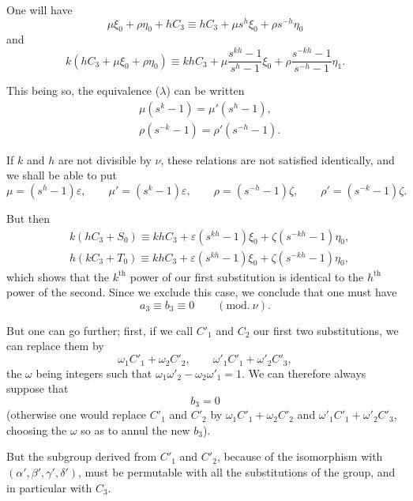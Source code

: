 \documentclass{article}
\begin{document}
One will have
\[ \mu\xi_{0} + \rho\eta_{0} + hC_{3} \equiv hC_{3} + \mu s^{h}\xi_{0} + \rho s^{-h}\eta_{0} \]
and
\[ k(hC_{3} + \mu\xi_{0} + \rho\eta_{0}) \equiv khC_{3} + \mu\frac{s^{kh} - 1}{s^{h} - 1}\xi_{0} + \rho\frac{s^{-kh} - 1}{s^{-h} - 1}\eta_{1}. \]

This being so, the equivalence ($\lambda$) can be written
\[ \begin{aligned} &\mu(s^{k} - 1) = \mu'(s^{h} - 1),\\ &\rho(s^{-k} - 1) = \rho'(s^{-h} - 1). \end{aligned} \]

If $k$ and $h$ are not divisible by $\nu$, these relations are not satisfied
identically, and we shall be able to put
\[ \mu = (s^{h} - 1)\varepsilon, \qquad \mu' = (s^{k} - 1)\varepsilon, \qquad \rho = (s^{-h} - 1)\zeta, \qquad \rho' = (s^{-k} - 1)\zeta. \]

But then
\[ \begin{aligned} &k(hC_{3} + S_{0}) \equiv khC_{3} + \varepsilon(s^{kh} - 1)\xi_{0} + \zeta(s^{-kh} - 1)\eta_{0},\\ &h(kC_{3} + T_{0}) \equiv khC_{3} + \varepsilon(s^{kh} - 1)\xi_{0} + \zeta(s^{-kh} - 1)\eta_{0}, \end{aligned} \]
which shows that the $k^{\text{th}}$ power of our first substitution is identical to the $h^{\text{th}}$ power of the second. Since we exclude this case, we conclude that one must have
\[ a_{3} \equiv b_{3} \equiv 0 \qquad (\text{mod.}\ \nu). \]

But one can go further; first, if we call $C'_{1}$ and $C_{2}$ our first two substitutions, we can replace them by
\[ \omega_{1}C'_{1} + \omega_{2}C'_{2}, \qquad \omega'_{1}C'_{1} + \omega'_{2}C'_{3}, \]
the $\omega$ being integers such that $\omega_{1}\omega'_{2} - \omega_{2}\omega'_{1} = 1$. We can therefore always suppose that
\[ b_{3} = 0 \]
(otherwise one would replace $C'_{1}$ and $C'_{2}$ by $\omega_{1}C'_{1} + \omega_{2}C'_{2}$ and $\omega'_{1}C'_{1} + \omega'_{2}C'_{3}$, choosing the $\omega$ so as to annul the new $b_{3}$).

But the subgroup derived from $C'_{1}$ and $C'_{2}$, because of the isomorphism with $(\alpha', \beta', \gamma', \delta')$, must be permutable with all the substitutions of the group, and in particular with $C_{3}$.
\end{document}

